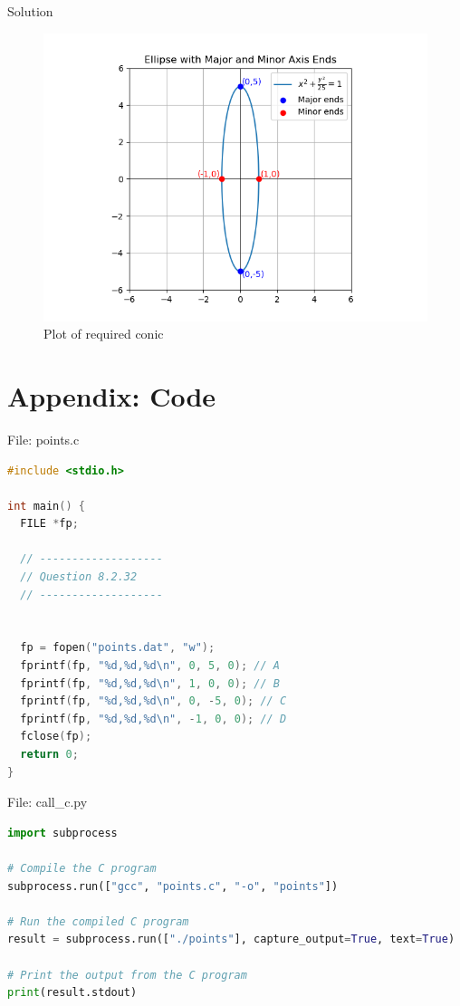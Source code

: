 \documentclass{beamer}
\numberwithin{equation}{section}
\theoremstyle{remark}
\begin{document}
\begin{frame}{Solution}
\begin{figure}[h!]
   \centering
   \includegraphics[width=0.8\linewidth]{figs/01.png}
   \caption{Plot of required conic}
   \label{Plot_1}
\end{figure}
\end{frame}
\section*{Appendix: Code}

\begin{frame}[fragile]{File: points.c}
\begin{lstlisting}[language=C]
#include <stdio.h>

int main() {
  FILE *fp;

  // -------------------
  // Question 8.2.32
  // -------------------


  fp = fopen("points.dat", "w");
  fprintf(fp, "%d,%d,%d\n", 0, 5, 0); // A
  fprintf(fp, "%d,%d,%d\n", 1, 0, 0); // B
  fprintf(fp, "%d,%d,%d\n", 0, -5, 0); // C
  fprintf(fp, "%d,%d,%d\n", -1, 0, 0); // D
  fclose(fp);
  return 0;
}
\end{lstlisting}
\end{frame}

\begin{frame}[fragile]{File: call\_c.py}
\begin{lstlisting}[language=Python]
import subprocess

# Compile the C program
subprocess.run(["gcc", "points.c", "-o", "points"])

# Run the compiled C program
result = subprocess.run(["./points"], capture_output=True, text=True)

# Print the output from the C program
print(result.stdout)
\end{lstlisting}
\end{frame}
\end{document}
